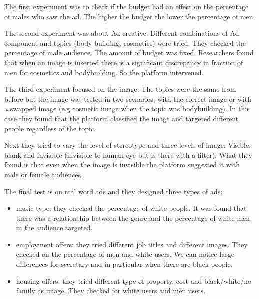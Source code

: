 The first experiment was to check if the budget had an effect on the percentage of males who saw the ad. The higher the budget the lower the percentage of men.

The second experiment was about Ad creative. Different combinations of Ad component and topics (body building, cosmetics) were tried. They checked the percentage of male audience. The amount of budget was fixed. Researchers found that when an image is inserted there is a significant discrepancy in fraction of men for cosmetics and bodybuilding. So the platform intervened.

The third experiment focused on the image. The topics were the same from before but the image was tested in two scenarios, with the correct image or with a swapped image (e.g cosmetic image when the topic was bodybuilding). In this case they found that the platform classified the image and targeted different people regardless of the topic.

Next they tried to vary the level of stereotype and three levels of image: Visible, blank and invisible (invisible to human eye but is there with a filter). What they found is that even when the image is invisible the platform suggested it with male or female audiences.

The final test is on real word ads and they designed three types of ads:
\begin{itemize}
    \item music type: they checked the percentage of white people. It was found that there was a relationship between the genre and the percentage of white men in the audience targeted.
    \item employment offers: they tried different job titles and different images. They checked on the percentage of men and white users. We can notice large differences for secretary and in particular when there are black people.
    \item housing offers: they tried different type of property, cost and black/white/no family as image. They checked for white users and men users.
\end{itemize}
